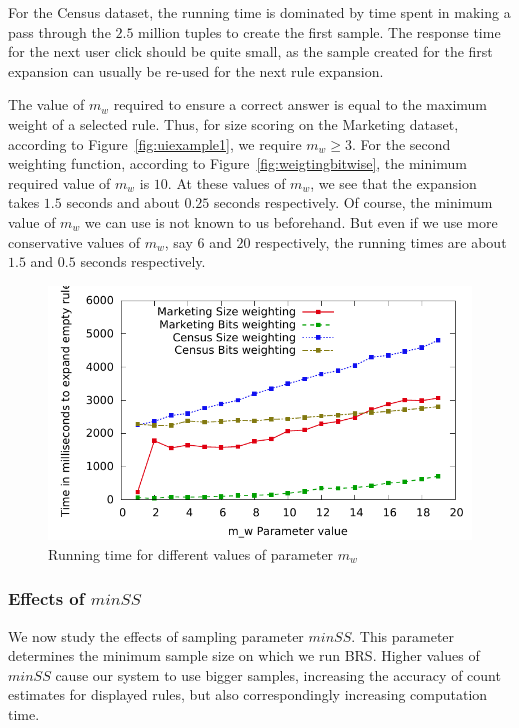 \documentclass[10pt,journal,compsoc]{IEEEtran}
\begin{document}
For the Census dataset, the running time is dominated by time spent in making a pass through the $2.5$ million tuples to create the first sample. The response time for the next user click should be quite small, as the sample created for the first expansion can usually be re-used for the next rule expansion.

The value of $m_w$ required to ensure a correct answer is equal to the maximum weight of a selected rule. Thus, for size scoring on the Marketing dataset, according to Figure~\ref{fig:uiexample1}, we require $m_w \geq 3$. For the second weighting function, according to Figure~\ref{fig:weigtingbitwise}, the minimum required value of $m_w$ is $10$. At these values of $m_w$, we see that the expansion takes $1.5$ seconds and about $0.25$ seconds respectively. Of course, the minimum value of $m_w$ we can use is not known to us beforehand. But even if we use more conservative values of $m_w$, say $6$ and $20$ respectively, the running times are about $1.5$ and $0.5$ seconds respectively.

\begin{figure}
\centering
  \includegraphics[scale=0.5]{graphs/mw_speed.pdf}%
  \caption{Running time for different values of parameter $m_w$ \label{fig:mw_speed}}
\vspace{-10pt}
\end{figure}

\subsubsection{Effects of $minSS$}
We now study the effects of sampling parameter $minSS$. This parameter determines the minimum sample size on which we run BRS. Higher values of $minSS$ cause our system to use bigger samples, increasing the accuracy of count estimates for displayed rules, but also correspondingly increasing computation time. 
\end{document}
